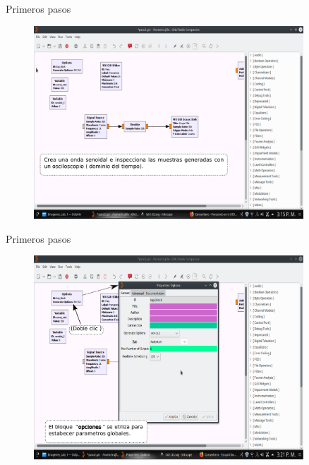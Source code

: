 \begin{frame}{Primeros pasos}
\begin{figure}[H]
\centering
\vspace{-3mm}
\includegraphics[width=0.9\textwidth]{lab1/pdf/lab1_2.pdf}
\end{figure}
\end{frame}

\begin{frame}{Primeros pasos}
\begin{figure}[H]
\vspace{-3mm}
\centering
\includegraphics[width=0.9\textwidth]{lab1/pdf/lab1_3.pdf}
\end{figure}
\end{frame}

